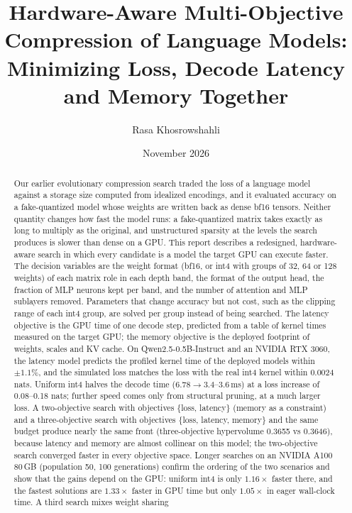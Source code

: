 \documentclass[11pt]{article}
\title{Hardware-Aware Multi-Objective Compression of Language Models:\\
Minimizing Loss, Decode Latency and Memory Together}
\author{Rasa Khosrowshahli}
\date{November 2026}
\begin{document}
\maketitle

\begin{abstract}
Our earlier evolutionary compression search traded the loss of a language model against a storage
size computed from idealized encodings, and it evaluated accuracy on a fake-quantized model whose
weights are written back as dense bf16 tensors. Neither quantity changes how fast the model runs: a
fake-quantized matrix takes exactly as long to multiply as the original, and unstructured sparsity at
the levels the search produces is slower than dense on a GPU. This report describes a redesigned,
hardware-aware search in which every candidate is a model the target GPU can execute faster. The
decision variables are the weight format (bf16, or int4 with groups of 32, 64 or 128 weights) of each
matrix role in each depth band, the format of the output head, the fraction of MLP neurons kept per
band, and the number of attention and MLP sublayers removed. Parameters that change accuracy but not
cost, such as the clipping range of each int4 group, are solved per group instead of being searched.
The latency objective is the GPU time of one decode step, predicted from a table of kernel times
measured on the target GPU; the memory objective is the deployed footprint of weights, scales and KV
cache. On Qwen2.5-0.5B-Instruct and an NVIDIA RTX 3060, the latency model predicts the profiled kernel
time of the deployed models within $\pm1.1\%$, and the simulated loss matches the loss with the real
int4 kernel within 0.0024 nats. Uniform int4 halves the decode time ($6.78\rightarrow3.4$--$3.6$\,ms)
at a loss increase of 0.08--0.18 nats; further speed comes only from structural pruning, at a much
larger loss. A two-objective search with objectives \{loss, latency\} (memory as a constraint) and a
three-objective search with objectives \{loss, latency, memory\} and the same budget produce nearly the
same front (three-objective
hypervolume 0.3655 vs 0.3646), because latency and memory are almost collinear on this model; the
two-objective search converged faster in every objective space. Longer searches on an NVIDIA A100 80\,GB
(population 50, 100 generations) confirm the ordering of the two scenarios and show that the gains depend
on the GPU: uniform int4 is only $1.16\times$ faster there, and the fastest solutions are $1.33\times$
faster in GPU time but only $1.05\times$ in eager wall-clock time. A third search mixes weight sharing

\end{abstract}
\end{document}
